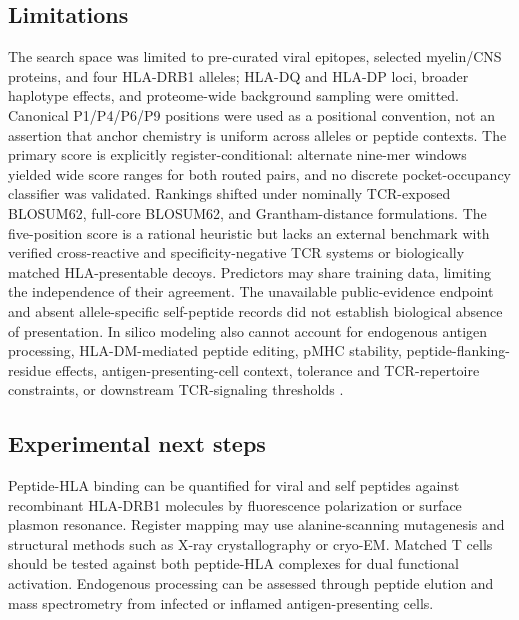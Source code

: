 \documentclass[11pt]{article}
\begin{document}
\subsection{Limitations}
The search space was limited to pre-curated viral epitopes, selected myelin/CNS proteins, and four HLA-DRB1 alleles; HLA-DQ and HLA-DP loci, broader haplotype effects, and proteome-wide background sampling were omitted. Canonical P1/P4/P6/P9 positions were used as a positional convention, not an assertion that anchor chemistry is uniform across alleles or peptide contexts. The primary score is explicitly register-conditional: alternate nine-mer windows yielded wide score ranges for both routed pairs, and no discrete pocket-occupancy classifier was validated. Rankings shifted under nominally TCR-exposed BLOSUM62, full-core BLOSUM62, and Grantham-distance formulations. The five-position score is a rational heuristic but lacks an external benchmark with verified cross-reactive and specificity-negative TCR systems or biologically matched HLA-presentable decoys. Predictors may share training data, limiting the independence of their agreement. The unavailable public-evidence endpoint and absent allele-specific self-peptide records did not establish biological absence of presentation. In silico modeling also cannot account for endogenous antigen processing, HLA-DM-mediated peptide editing, pMHC stability, peptide-flanking-residue effects, antigen-presenting-cell context, tolerance and TCR-repertoire constraints, or downstream TCR-signaling thresholds \cite{denzin}.

\subsection{Experimental next steps}
Peptide-HLA binding can be quantified for viral and self peptides against recombinant HLA-DRB1 molecules by fluorescence polarization or surface plasmon resonance. Register mapping may use alanine-scanning mutagenesis and structural methods such as X-ray crystallography or cryo-EM. Matched T cells should be tested against both peptide-HLA complexes for dual functional activation. Endogenous processing can be assessed through peptide elution and mass spectrometry from infected or inflamed antigen-presenting cells.
\end{document}
